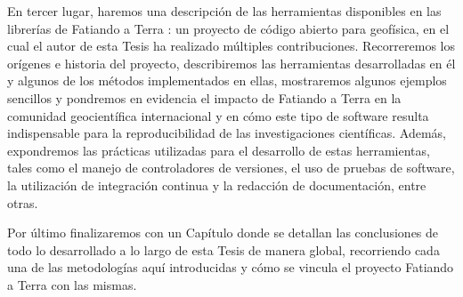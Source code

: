 En tercer lugar, haremos una descripción de las herramientas disponibles en las
librerías de Fatiando a Terra \citep{uieda2013}: un proyecto de código abierto
para geofísica, en el cual el autor de esta Tesis ha realizado múltiples
contribuciones.
Recorreremos los orígenes e historia del proyecto, describiremos las
herramientas desarrolladas en él y algunos de los métodos implementados en
ellas, mostraremos algunos ejemplos sencillos y pondremos en evidencia el
impacto de Fatiando a Terra en la comunidad geocientífica internacional y en
cómo este tipo de software resulta indispensable para la reproducibilidad de
las investigaciones científicas.
Además, expondremos las prácticas utilizadas para el desarrollo de estas
herramientas, tales como el manejo de controladores de versiones, el uso de
pruebas de software, la utilización de integración continua y la redacción de
documentación, entre otras.

Por último finalizaremos con un Capítulo donde se detallan las
conclusiones de todo lo desarrollado a lo largo de esta Tesis de manera global,
recorriendo cada una de las metodologías aquí introducidas y cómo se
vincula el proyecto Fatiando a Terra con las mismas.
